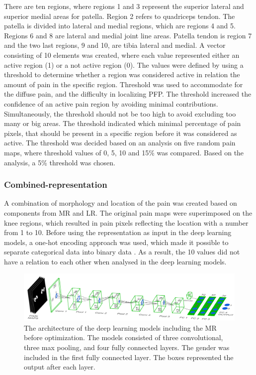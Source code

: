 \noindent 
There are ten regions, where regions 1 and 3 represent the superior lateral and superior medial areas for patella. Region 2 refers to quadriceps tendon. The patella is divided into lateral and medial regions, which are regions 4 and 5. Regions 6 and 8 are lateral and medial joint line areas. Patella tendon is region 7 and the two last regions, 9 and 10, are tibia lateral and medial.\citep{Elson2010} \newline
\noindent
A vector consisting of 10 elements was created, where each value represented either an active region (1) or a not active region (0). The values were defined by using a threshold to determine whether a region was considered active in relation the amount of pain in the specific region. Threshold was used to accommodate for the diffuse pain, and the difficulty in localizing PFP. The threshold increased the confidence of an active pain region by avoiding minimal contributions. Simultaneously, the threshold should not be too high to avoid excluding too many or big areas. The threshold indicated which minimal percentage of pain pixels, that should be present in a specific region before it was considered as active. The threshold was decided based on an analysis on five random pain maps, where threshold values of 0, 5, 10 and 15\% was compared. Based on the analysis, a 5\% threshold was chosen.  

\subsubsection{Combined-representation}
A combination of morphology and location of the pain was created based on components from MR and LR. The original pain maps were superimposed on the knee regions, which resulted in pain pixels reflecting the location with a number from 1 to 10. Before using the representation as input in the deep learning models, a one-hot encoding approach was used, which made it possible to separate categorical data into binary data \citep{Harris2012}. As a result, the 10 values did not have a relation to each other when analysed in the deep learning models. 


\begin{figure} [t!]
\centering
\includegraphics[width=1\textwidth]{Figures/models}
\caption{The architecture of the deep learning models including the MR before optimization. The models consisted of three convolutional, three max pooling, and four fully connected layers. The gender was included in the first fully connected layer. The boxes represented the output after each layer.}
\label{fig:models}
\end{figure}

